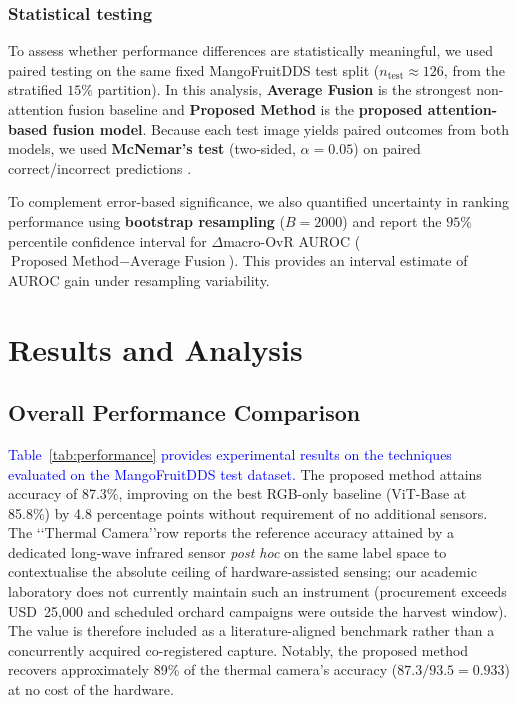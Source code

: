 \documentclass[utf8]{FrontiersinHarvard} %
\begin{document}
\begingroup\color{blue}
\subsubsection{Statistical testing}
\label{sec:stat_testing}
To assess whether performance differences are statistically meaningful, we used paired testing on the same fixed MangoFruitDDS test split (\(n_{\mathrm{test}} \approx 126\), from the stratified \(15\%\) partition). In this analysis, \textbf{Average Fusion} is the strongest non-attention fusion baseline and \textbf{Proposed Method} is the \textbf{proposed attention-based fusion model}. Because each test image yields paired outcomes from both models, we used \textbf{McNemar's test} (two-sided, \(\alpha=0.05\)) on paired correct/incorrect predictions \cite{dietterich1998}.

To complement error-based significance, we also quantified uncertainty in ranking performance using \textbf{bootstrap resampling} (\(B=2000\)) and report the \(95\%\) percentile confidence interval for \(\Delta\)macro-OvR AUROC (\(\text{Proposed Method} - \text{Average Fusion}\)). This provides an interval estimate of AUROC gain under resampling variability.

\endgroup

\section{Results and Analysis}

\subsection{Overall Performance Comparison}
\textcolor{blue}{Table~\ref{tab:performance} provides experimental results on the techniques evaluated on the MangoFruitDDS test dataset.} The proposed method attains accuracy of 87.3\%, improving on the best RGB-only baseline (ViT-Base at 85.8\%) by 4.8 percentage points without requirement of no additional sensors. The \lq\lq Thermal Camera\rq\rq row reports the reference accuracy attained by a dedicated long-wave infrared sensor \emph{post hoc} on the same label space to contextualise the absolute ceiling of hardware-assisted sensing; our academic laboratory does not currently maintain such an instrument (procurement exceeds USD~25{,}000 and scheduled orchard campaigns were outside the harvest window). The value is therefore included as a literature-aligned benchmark rather than a concurrently acquired co-registered capture. Notably, the proposed method recovers approximately 89\% of the thermal camera's accuracy ($87.3/93.5 = 0.933$) at no cost of the hardware.
\end{document}
